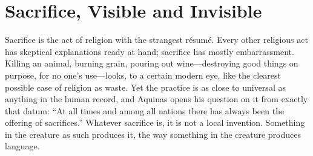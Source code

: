 \section{Sacrifice, Visible and Invisible}

Sacrifice is the act of religion with the strangest résumé. Every other religious act has skeptical explanations ready at hand; sacrifice has mostly embarrassment. Killing an animal, burning grain, pouring out wine---destroying good things on purpose, for no one's use---looks, to a certain modern eye, like the clearest possible case of religion as waste. Yet the practice is as close to universal as anything in the human record, and Aquinas opens his question on it from exactly that datum: ``At all times and among all nations there has always been the offering of sacrifices.'' Whatever sacrifice is, it is not a local invention. Something in the creature as such produces it, the way something in the creature produces language.

